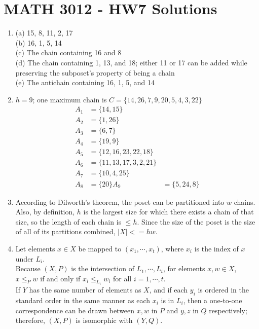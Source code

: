 \documentclass[a4paper,12pt]{article}
\begin{document}
\section*{MATH 3012 - HW7 Solutions}

\begin{enumerate}
	\item (a) 15, 8, 11, 2, 17 \\
	(b) 16, 1, 5, 14 \\
	(c) The chain containing 16 and 8 \\
	(d) The chain containing 1, 13, and 18; either 11 or 17 can be added while preserving the subposet's property of being a chain \\
	(e) The antichain containing 16, 1, 5, and 14
	
	\item $h = 9$; one maximum chain is $C = \{ 14, 26, 7, 9, 20, 5, 4, 3, 22 \}$
	\begin{align*}
	A_1 &= \{ 14, 15 \} \\
	A_2 &= \{ 1, 26 \} \\
	A_3 &= \{ 6, 7 \} \\
	A_4 &= \{ 19, 9 \} \\
	A_5 &= \{ 12, 16, 23, 22, 18 \} \\
	A_6 &= \{ 11, 13, 17, 3, 2, 21\} \\
	A_7 &= \{ 10, 4, 25 \} \\
	A_8 &= \{ 20 \}
	A_9 &= \{ 5, 24, 8 \}
	\end{align*}

	\item According to Dilworth's theorem, the poset can be partitioned into $w$ chains. Also, by definition, $h$ is the largest size for which there exists a chain of that size, so the length of each chain is $\leq h$. Since the size of the poset is the size of all of its partitions combined, $|X| <= hw$.
	
	\item Let elements $x \in X$ be mapped to $(x_1, \cdots, x_t)$, where $x_i$ is the index of $x$ under $L_i$. \\
	Because $(X, P)$ is the intersection of $L_1, \cdots, L_t$, for elements $x, w \in X$, $x \leq_P w$ if and only if $x_i \leq_{L_i} w_i$ for all $i = 1, \cdots, t$. \\
	If $Y$ has the same number of elements as $X$, and if each $y_i$ is ordered in the standard order in the same manner as each $x_i$ is in $L_i$, then a one-to-one correspondence can be drawn between $x, w$ in $P$ and $y, z$ in $Q$ respectively; therefore, $(X, P)$ is isomorphic with $(Y, Q)$.
\end{enumerate}
\end{document}
